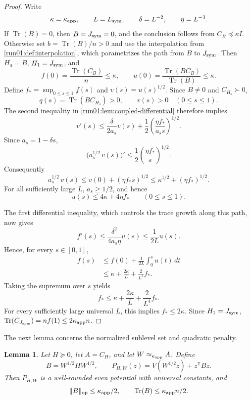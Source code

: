 \documentclass[11pt]{article}
\numberwithin{equation}{section}
\newtheorem{lemma}{Lemma}[section]
\theoremstyle{definition}
\begin{document}
\begin{proof}
Write
\[
\kappa=\kappa_{\rm app},
\qquad
L=L_{\rm sym},
\qquad
\delta=L^{-2},
\qquad
\eta=L^{-3}.
\]
If $\operatorname{Tr}(B)=0$, then
$B=J_{\rm sym}=0$, and the conclusion follows from
$C_B\preceq\kappa I$.
Otherwise set $b=\operatorname{Tr}(B)/n>0$ and use the interpolation from
\cref{run01:def:interpolation}, which parametrizes the path from
$B$ to
$J_{\rm sym}$.
Then $H_0=B$,
$H_1=J_{\rm sym}$, and
\[
f(0)
=\frac{\operatorname{Tr}(C_B)}n
\leq\kappa,
\qquad
u(0)
=\frac{\operatorname{Tr}(BC_B)}{\operatorname{Tr}(B)}
\leq\kappa.
\]
Define $f_*=\sup_{0\leq s\leq1}f(s)$ and
$v(s)=u(s)^{1/2}$.
Since $B\neq0$ and
$C_{H_s}\succ0$,
\[
q(s)
=\operatorname{Tr}(BC_{H_s})
>0,
\qquad
v(s)>0
\quad
(0\leq s\leq1).
\]
The second inequality in \cref{run01:lem:coupled-differential} therefore implies
\[
 v'(s)\leq\frac{\delta}{2a_s}v(s)
 +\frac12\left(\frac{\eta f_*}{a_s s}\right)^{1/2}.
\]
Since $a_s=1-\delta s$,
\[
 \bigl(a_s^{1/2}\,v(s)\bigr)'
 \leq\frac12\left(\frac{\eta f_*}{s}\right)^{1/2}.
\]
Consequently
\[
a_s^{1/2}\,v(s)
\leq v(0)+(\eta f_*s)^{1/2}
\leq\kappa^{1/2}+(\eta f_*)^{1/2}.
\]
For all sufficiently large $L$,
$a_s\geq1/2$, and hence
\[
 u(s)\leq4\kappa+4\eta f_*
 \qquad(0\leq s\leq1).
\]

The first differential inequality, which controls the trace growth along this
path, now gives
\[
f'(s)
\leq\frac{\delta^2}{4a_s\eta}u(s)
\leq\frac{1}{2L}u(s).
\]
Hence, for every $s\in[0,1]$,
\[
 \begin{aligned}
 f(s)
 &\leq f(0)+\frac{1}{2L}\int_0^su(t)\,dt\\
 &\leq\kappa+\frac{2\kappa}{L}+\frac{2}{L^4}f_*.
 \end{aligned}
\]
Taking the supremum over $s$ yields
\[
 f_*\leq\kappa+\frac{2\kappa}{L}+\frac{2}{L^4}f_*.
\]
For every sufficiently large universal $L$, this implies
$f_*\leq2\kappa$.
Since $H_1=J_{\rm sym}$,
$\operatorname{Tr}(C_{J_{\rm sym}})=nf(1)\leq2\kappa_{\rm app}n$.
\end{proof}
\space The next lemma concerns the normalized sublevel set and quadratic
penalty.

\begin{lemma}
\label{run01:lem:normalized-ground}
Let $H\succeq0$, let
$A=C_H$, and let
$W\approx_{\kappa_{\rm app}}A$.
Define
\[
B=W^{1/2}HW^{1/2},
\qquad
P_{H,W}(z)=V(W^{1/2}z)+z^{\mathsf T} Bz.
\]
Then $P_{H,W}$ is a well-rounded even potential with universal constants, and
\[
\|B\|_{\mathrm{op}}\leq\kappa_{\rm app}/2,
\qquad
\operatorname{Tr}(B)\leq\kappa_{\rm app}n/2.
\]
\end{lemma}
\end{document}
